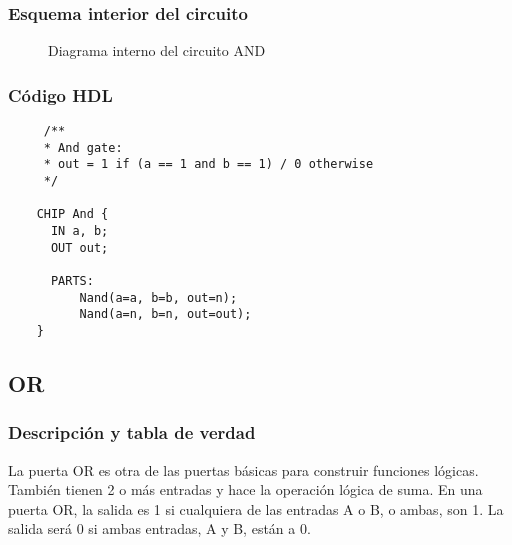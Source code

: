 \documentclass[12pt]{article}
\begin{document}
        \subsubsection{Esquema interior del circuito}
            \begin{figure}[H]
                \centering
                
                \caption{Diagrama interno del circuito AND} \cite{diagram}
                \label{fig:enter-label} 
            \end{figure}
        \newpage \subsubsection{Código HDL}
            \begin{lstlisting}
     /**
     * And gate:
     * out = 1 if (a == 1 and b == 1) / 0 otherwise
     */
    
    CHIP And {
      IN a, b;
      OUT out;
    
      PARTS:
          Nand(a=a, b=b, out=n);
          Nand(a=n, b=n, out=out);
    } 
            \end{lstlisting}
    \newpage  
    
    \subsection{OR}
        \subsubsection{Descripción y tabla de verdad}
            La puerta OR es otra de las puertas básicas para construir funciones lógicas. También tienen 2 o más entradas y hace la operación lógica de suma.
            En una puerta OR, la salida es 1 si cualquiera de las entradas A o B, o ambas, son 1. La salida será 0 si ambas entradas, A y B, están a 0. 

            \begin{table}[H]
            \centering
            \caption{Tabla de verdad de OR}
            \label{tab:OR}
            \end{table}
\end{document}
